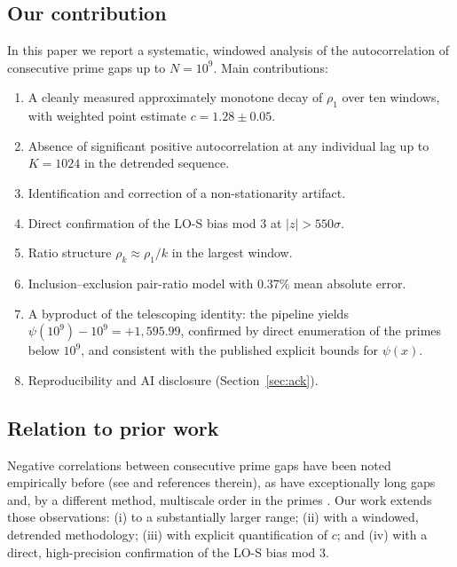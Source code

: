 \documentclass[11pt]{article}
\begin{document}
\subsection{Our contribution}
In this paper we report a systematic, windowed analysis of the
autocorrelation of consecutive prime gaps up to $N = 10^9$. Main
contributions:
\begin{enumerate}
\item A cleanly measured approximately monotone decay of $\rho_1$ over
      ten windows, with weighted point estimate $c = 1.28 \pm 0.05$.
\item Absence of significant positive autocorrelation at any individual
      lag up to $K = 1024$ in the detrended sequence.
\item Identification and correction of a non-stationarity artifact.
\item Direct confirmation of the LO-S bias mod 3 at $|z| > 550\sigma$.
\item Ratio structure $\rho_k \approx \rho_1/k$ in the largest window.
\item Inclusion--exclusion pair-ratio model with 0.37\% mean absolute
      error.
\item A byproduct of the telescoping identity: the pipeline yields
      $\psi(10^9) - 10^9 = +1{,}595.99$, confirmed by direct
      enumeration of the primes below $10^9$, and consistent with the
      published explicit bounds for $\psi(x)$.
\item Reproducibility and AI disclosure (Section~\ref{sec:ack}).
\end{enumerate}

\subsection{Relation to prior work}
Negative correlations between consecutive prime gaps have been noted
empirically before (see \cite{Brent1974} and references therein), as
have exceptionally long gaps \cite{Ford2018} and, by a different
method, multiscale order in the primes \cite{Torquato2018}. Our
work extends those observations: (i) to a substantially larger range;
(ii) with a windowed, detrended methodology; (iii) with explicit
quantification of $c$; and (iv) with a direct, high-precision
confirmation of the LO-S bias mod 3.
\end{document}

